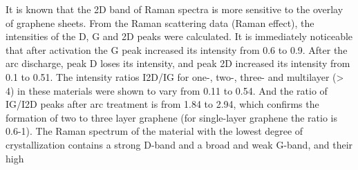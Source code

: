 \begin{multicols}{2}
It is known that the 2D band of Raman spectra is more sensitive to the
overlay of graphene sheets. From the Raman scattering data (Raman
effect), the intensities of the D, G and 2D peaks were calculated. It is
immediately noticeable that after activation the G peak increased its
intensity from 0.6 to 0.9. After the arc discharge, peak D loses its
intensity, and peak 2D increased its intensity from 0.1 to 0.51. The
intensity ratios I2D/IG for one-, two-, three- and multilayer
(\textgreater{} 4) in these materials were shown to vary from 0.11 to
0.54. And the ratio of IG/I2D peaks after arc treatment is from 1.84 to
2.94, which confirms the formation of two to three layer graphene (for
single-layer graphene the ratio is 0.6-1). The Raman spectrum of the
material with the lowest degree of crystallization contains a strong
D-band and a broad and weak G-band, and their high
\end{multicols}

